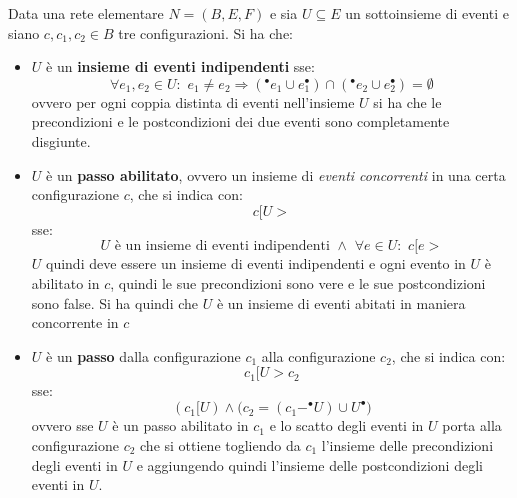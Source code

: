 \documentclass[a4paper,12pt, oneside]{book}
\begin{document}
\begin{definizione}
  Data una rete elementare $N=(B,E,F)$ e sia $U \subseteq E$ un sottoinsieme di
  eventi e siano $c,c_1,c_2\in B$ tre configurazioni. Si ha che:
  \begin{itemize}
    \item $U$ è un \textbf{insieme di eventi indipendenti} sse:
    \[\forall e_1,e_2\in U:\,\,e_1\neq e_2\Rightarrow (^\bullet e_1\cup
      e_1^\bullet)\cap  (^\bullet e_2\cup e_2^\bullet) = \emptyset\]
    ovvero per ogni coppia distinta di eventi nell'insieme $U$ si ha che le
    precondizioni e le postcondizioni dei due eventi sono completamente
    disgiunte.
    \item $U$ è un \textbf{passo abilitato}, ovvero un insieme di \textit{eventi
      concorrenti} in una certa configurazione $c$, che si indica con:
    \[c[U>\]
    sse:
    \[U \mbox{ è un insieme di eventi indipendenti } \wedge\,\, \forall e\in
      U:\,\, c[e>\]
    $U$ quindi deve essere un insieme di eventi indipendenti e ogni evento in
    $U$ è abilitato in $c$, quindi le sue precondizioni sono vere e le sue
    postcondizioni sono false. Si ha quindi che $U$ è un insieme di eventi
    abitati in maniera concorrente in $c$
    \item $U$ è un \textbf{passo} dalla configurazione $c_1$ alla configurazione
    $c_2$, che si indica con:
    \[c_1[U > c_2\]
    sse:
    \[(c_1[U) \wedge \Big(c_2=(c_1-^\bullet U)\cup U^\bullet\Big)\]
    ovvero sse $U$ è un passo abilitato in $c_1$ e lo scatto degli eventi in $U$
    porta alla configurazione $c_2$ che si ottiene togliendo da $c_1$ l'insieme
    delle precondizioni degli eventi in $U$ e aggiungendo quindi l'insieme delle
    postcondizioni degli eventi in $U$.
  \end{itemize}
\end{definizione}
\end{document}

